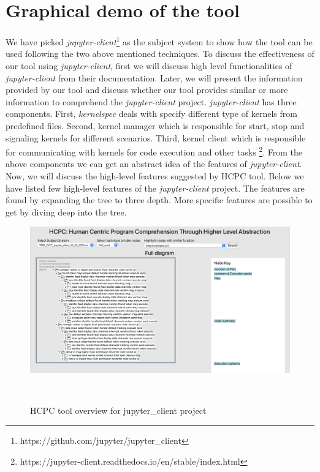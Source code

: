 \section{Graphical demo of the tool} 
We have picked \emph{jupyter-client}\footnote{https://github.com/jupyter/jupyter\_client} as the subject system to show how the tool can be used following the two above mentioned techniques. To discuss the effectiveness of our tool using \emph{jupyter-client}, first we will discuss high level functionalities of \emph{jupyter-client} from their documentation. Later, we will present the information provided by our tool and discuss whether our tool provides similar or more information to comprehend the \emph{jupyter-client} project. \emph{jupyter-client} has three components. First, \emph{kernelspec} deals with specify different type of kernels from predefined files. Second, kernel manager which is responsible for start, stop and signaling kernels for different scenarios. Third, kernel client which is responsible for communicating with kernels for code execution and other tasks \footnote{https://jupyter-client.readthedocs.io/en/stable/index.html}. From the above components we can get an abstract idea of the features of \emph{jupyter-client}. Now, we will discuss the high-level features suggested by HCPC tool. Below we have listed few high-level features of the \emph{jupyter-client} project. The features are found by expanding the tree to three depth. More specific features are possible to get by diving deep into the tree.

\begin{figure}[h]
  \centering
  \includegraphics[width=\columnwidth]{figures/hla3/tool_overview_jupyter.png}
  \caption{HCPC tool overview for jupyter\_client project }~\label{fig:tool_overview_jupyter_client}
\end{figure}

